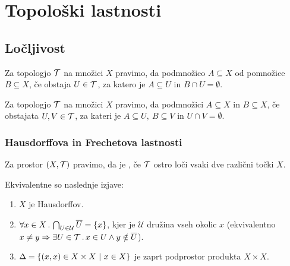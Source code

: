 \section{Topološki lastnosti}
\subsection{Ločljivost}
\begin{definicija}
    Za topologjo $\mathcal{T}$ na množici $X$ pravimo, da  podmnožico $A \subseteq X$ od pomnožice $B \subseteq X$, če obstaja $U \in \mathcal{T}$, za katero je $A \subseteq U$ in $B \cap U = \emptyset$.
\end{definicija}

\begin{definicija}
    Za topologjo $\mathcal{T}$ na množici $X$ pravimo, da  podmnožici $A \subseteq X$ in $B \subseteq X$, če obstajata $U, V \in \mathcal{T}$, za kateri je $A \subseteq U, \ B \subseteq V$ in $U \cap V = \emptyset$.
\end{definicija}

\subsubsection{Hausdorffova in Frechetova lastnosti}
\begin{definicija}
    Za prostor $(X, \mathcal{T})$ pravimo, da je , če $\mathcal{T}$ ostro loči vsaki dve različni točki $X$.
\end{definicija}

\begin{trditev}
    Ekvivalentne so naslednje izjave:
    \begin{enumerate}
        \item $X$ je Hausdorffov.
        \item $\forall x \in X \,.\, \bigcap_{U \in \mathcal{U}} \overline{U} = \left\{x\right\}$, kjer je $\mathcal{U}$ družina vseh okolic $x$ (ekvivalentno $x \neq y \Rightarrow \exists U \in \mathcal{T} \,.\, x \in U \land y \notin \overline{U}$).
        \item {} $\Delta = \left\{(x,x) \in X \times X \ | \ x \in X\right\}$ je zaprt podprostor produkta $X \times X$.
    \end{enumerate}
\end{trditev}

